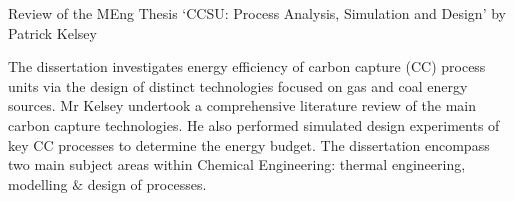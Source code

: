 \documentclass[14pt,twoside]{report}
\begin{document}
\vfill
\clearpage



\bigskip 

\begin{center}
  {\Large Review of the MEng Thesis `CCSU: Process Analysis, Simulation and Design' by Patrick Kelsey}
\end{center}
The dissertation investigates energy efficiency of carbon capture (CC) process units via the design of distinct technologies focused on gas and coal energy sources. Mr Kelsey undertook a comprehensive literature review of the main carbon capture technologies. He also performed simulated design experiments of key CC processes to determine the energy budget. The dissertation encompass two main subject areas within Chemical Engineering: thermal engineering, modelling $\&$ design of processes.
\end{document}
